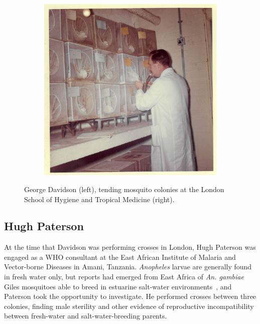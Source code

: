 \begin{refsection}
\begin{figure}[t]
\begin{subfigure}[t]{0.57\textwidth}
\includegraphics[width=1\textwidth,center]{artwork/chapter2/davidson-colonies.jpeg}
\end{subfigure}
\caption{George Davidson (left), tending mosquito colonies at the London School of Hygiene and Tropical Medicine (right).}
\label{fig:davidson}
\end{figure}


\subsection{Hugh Paterson}\label{subsec:hugh-paterson}

At the time that Davidson was performing crosses in London, Hugh Paterson was engaged as a WHO consultant at the East African Institute of Malaria and Vector-borne Diseases in Amani, Tanzania.
%
\textit{Anopheles} larvae are generally found in fresh water only, but reports had emerged from East Africa of \textit{An. gambiae} Giles mosquitoes able to breed in estuarine salt-water environments~\parencite{DeMeillon1947,MuirheadThomson1948}, and Paterson took the opportunity to investigate.
%
He performed crosses between three colonies, finding male sterility and other evidence of reproductive incompatibility between fresh-water and salt-water-breeding parents.


\end{refsection}
